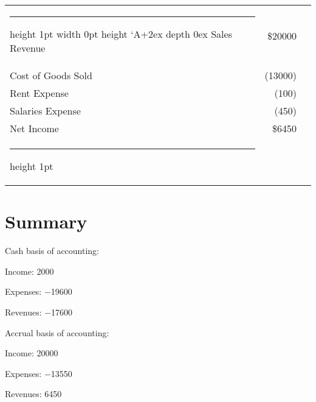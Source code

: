 \documentclass{article}\usepackage[]{graphicx}\usepackage[]{xcolor}
\makeatletter
\newcommand{\thickhline}{%
    \noalign {\ifnum 0=`}\fi \hrule height 1pt
    \futurelet \reserved@a \@xhline
}
\newcommand\SEPx[1]{\vrule width 0pt height \dimexpr\fontcharht\font`A+2ex depth #1ex\relax}
\newcommand\SEP{\SEPx{0}}
\newcommand\?{\hphantom{0}}
\makeatother
\begin{document}
\begin{table}[H]
\begin{tabularx}{\linewidth}{I R R}
\thickhline\SEP
Sales Revenue                               & \$\hphantom{(}\num{20000}\hphantom{)}\\
Cost of Goods Sold                          & (\num{13000})\\
Rent Expense                                & (\num{100})\\
Salaries Expense                            & (\num{450})\\
Net Income                                  & \$\hphantom{(}\num{6450}\hphantom{)}\\[2ex]
\thickhline 
\end{tabularx}
\end{table}

\section{Summary}

Cash basis of accounting:\par

Income:   \num{2000}\par
Expenses: \num{-19600}\par
Revenues: \num{-17600}\par

Accrual basis of accounting:\par

Income:   \num{20000}\par
Expenses: \num{-13550}\par
Revenues: \num{6450}\par
\end{document}
